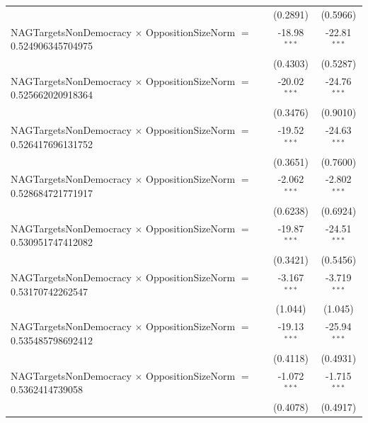 \begin{tabular}{lcc}
                                                                                & (0.2891)             & (0.5966)\\   
   NAGTargetsNonDemocracy $\times$ OppositionSizeNorm $=$ 0.524906345704975     & -18.98$^{***}$       & -22.81$^{***}$\\   
                                                                                & (0.4303)             & (0.5287)\\   
   NAGTargetsNonDemocracy $\times$ OppositionSizeNorm $=$ 0.525662020918364     & -20.02$^{***}$       & -24.76$^{***}$\\   
                                                                                & (0.3476)             & (0.9010)\\   
   NAGTargetsNonDemocracy $\times$ OppositionSizeNorm $=$ 0.526417696131752     & -19.52$^{***}$       & -24.63$^{***}$\\   
                                                                                & (0.3651)             & (0.7600)\\   
   NAGTargetsNonDemocracy $\times$ OppositionSizeNorm $=$ 0.528684721771917     & -2.062$^{***}$       & -2.802$^{***}$\\   
                                                                                & (0.6238)             & (0.6924)\\   
   NAGTargetsNonDemocracy $\times$ OppositionSizeNorm $=$ 0.530951747412082     & -19.87$^{***}$       & -24.51$^{***}$\\   
                                                                                & (0.3421)             & (0.5456)\\   
   NAGTargetsNonDemocracy $\times$ OppositionSizeNorm $=$ 0.53170742262547      & -3.167$^{***}$       & -3.719$^{***}$\\   
                                                                                & (1.044)              & (1.045)\\   
   NAGTargetsNonDemocracy $\times$ OppositionSizeNorm $=$ 0.535485798692412     & -19.13$^{***}$       & -25.94$^{***}$\\   
                                                                                & (0.4118)             & (0.4931)\\   
   NAGTargetsNonDemocracy $\times$ OppositionSizeNorm $=$ 0.5362414739058       & -1.072$^{***}$       & -1.715$^{***}$\\   
                                                                                & (0.4078)             & (0.4917)\\   

\end{tabular}
